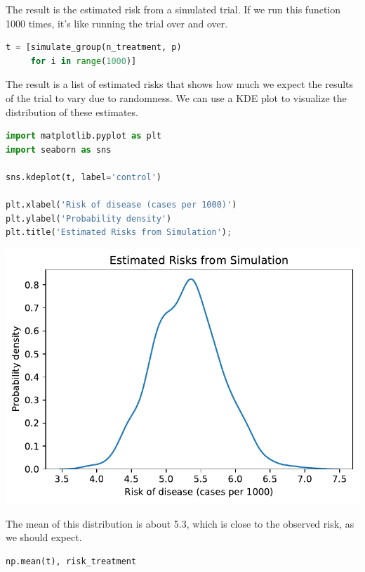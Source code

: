 The result is the estimated risk from a simulated trial. If we run this
function 1000 times, it's like running the trial over and over.

\begin{lstlisting}[language=Python,style=source]
t = [simulate_group(n_treatment, p)
     for i in range(1000)]
\end{lstlisting}

The result is a list of estimated risks that shows how much we expect
the results of the trial to vary due to randomness. We can use a KDE
plot to visualize the distribution of these estimates.

\begin{lstlisting}[language=Python,style=source]
import matplotlib.pyplot as plt
import seaborn as sns

sns.kdeplot(t, label='control')

plt.xlabel('Risk of disease (cases per 1000)')
plt.ylabel('Probability density')
plt.title('Estimated Risks from Simulation');
\end{lstlisting}

\begin{center}
\includegraphics[scale=0.75]{11_resampling_files/11_resampling_30_0.pdf}
\end{center}

The mean of this distribution is about 5.3, which is close to the
observed risk, as we should expect.

\begin{lstlisting}[language=Python,style=source]
np.mean(t), risk_treatment
\end{lstlisting}

